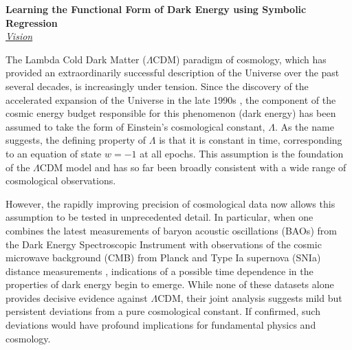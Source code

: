 \documentclass[11pt]{article}
\newcommand{\db}[1]{{\color{purple}[DJB: #1]}}
\begin{document}
%

\researchproposal


\textbf{Learning the Functional Form of Dark Energy using Symbolic Regression}\\
\underline{\textit{Vision}}

The Lambda Cold Dark Matter ($\Lambda$CDM) paradigm of cosmology, which has provided an extraordinarily successful description of the Universe over the past several decades, is increasingly under tension. Since the discovery of the accelerated expansion of the Universe in the  late 1990s \citep{Riess_1998,Perlmutter_1999}, the component of the cosmic energy budget responsible for this phenomenon (dark energy) has been assumed to take the form of Einstein’s cosmological constant, $\Lambda$. 
As the name suggests, the defining property of $\Lambda$ is that it is constant in time, corresponding to an equation of state $w=-1$ at all epochs. This assumption is the foundation of the $\Lambda$CDM model and has so far been broadly consistent with a wide range of cosmological observations.

However, the rapidly improving precision of cosmological data now allows this assumption to be tested in unprecedented detail. In particular, when one combines the latest measurements of baryon acoustic oscillations (BAOs) from the Dark Energy Spectroscopic Instrument \citep{DESI_2025_III} with observations of the cosmic microwave background (CMB) from Planck \citep{Planck_2018_VI} and Type Ia supernova (SNIa) distance measurements \citep{DES_2024}, indications of a possible time dependence in the properties of dark energy begin to emerge. While none of these datasets alone provides decisive evidence against $\Lambda$CDM, their joint analysis suggests mild but persistent deviations from a pure cosmological constant. If confirmed, such deviations would have profound implications for fundamental physics and cosmology.
\end{document}
